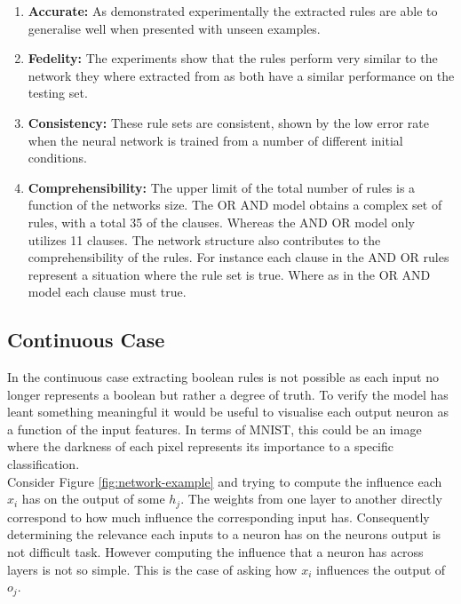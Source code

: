 \begin{enumerate}
	\item \textbf{Accurate:} As demonstrated experimentally the extracted rules are able to generalise well when presented with unseen examples.
	\item \textbf{Fedelity:} The experiments show that the rules perform very similar to the network they where extracted from as both have a similar performance on the testing set.
	\item \textbf{Consistency:} These rule sets are consistent, shown by the low error rate when the neural network is trained from a number of different initial conditions.
	\item \textbf{Comprehensibility:} The upper limit of the total number of rules is a function of the networks size. The OR AND model obtains a complex set of rules, with a total 35 of the clauses. Whereas the AND OR model only utilizes 11 clauses. The network structure also contributes to the comprehensibility of the rules. For instance each clause in the AND OR rules represent a situation where the rule set is true. Where as in the OR AND model each clause must true.
\end{enumerate}

\subsection{Continuous Case}
In the continuous case extracting boolean rules is not possible as each input no longer represents a boolean but rather a degree of truth. To verify the model has leant something meaningful it would be useful to visualise each output neuron as a function of the input features. In terms of MNIST, this could be an image where the darkness of each pixel represents its importance to a specific classification.\\

Consider Figure \ref{fig:network-example} and trying to compute the influence each $x_i$ has on the output of some $h_j$. The weights from one layer to another directly correspond to how much influence the corresponding input has. Consequently determining the relevance each inputs to a neuron has on the neurons output is not difficult task. However computing the influence that a neuron has across layers is not so simple. This is the case of asking how $x_i$ influences the output of $o_j$.

